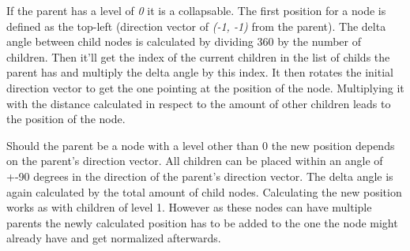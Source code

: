 If the parent has a level of \emph{0} it is a collapsable. The first position for a node is defined as the top-left (direction vector of \emph{(-1, -1)} from the parent). The delta angle between child nodes is calculated by dividing 360 by the number of children. Then it'll get the index of the current children in the list of childs the parent has and multiply the delta angle by this index. It then rotates the initial direction vector to get the one pointing at the position of the node. Multiplying it with the distance calculated in respect to the amount of other children leads to the position of the node.

Should the parent be a node with a level other than 0 the new position depends on the parent's direction vector. All children can be placed within an angle of +-90 degrees in the direction of the parent's direction vector. The delta angle is again calculated by the total amount of child nodes. Calculating the new position works as with children of level 1. However as these nodes can have multiple parents the newly calculated position has to be added to the one the node might already have and get normalized afterwards.

